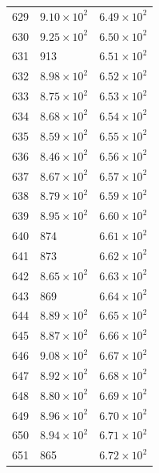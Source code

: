 \begin{table}[H]
\begin{tabular}{lll}
629 & $\displaystyle 9.10 \times 10^{2}$ & $\displaystyle 6.49 \times 10^{2}$ \\
630 & $\displaystyle 9.25 \times 10^{2}$ & $\displaystyle 6.50 \times 10^{2}$ \\
631 & 913 & $\displaystyle 6.51 \times 10^{2}$ \\
632 & $\displaystyle 8.98 \times 10^{2}$ & $\displaystyle 6.52 \times 10^{2}$ \\
633 & $\displaystyle 8.75 \times 10^{2}$ & $\displaystyle 6.53 \times 10^{2}$ \\
634 & $\displaystyle 8.68 \times 10^{2}$ & $\displaystyle 6.54 \times 10^{2}$ \\
635 & $\displaystyle 8.59 \times 10^{2}$ & $\displaystyle 6.55 \times 10^{2}$ \\
636 & $\displaystyle 8.46 \times 10^{2}$ & $\displaystyle 6.56 \times 10^{2}$ \\
637 & $\displaystyle 8.67 \times 10^{2}$ & $\displaystyle 6.57 \times 10^{2}$ \\
638 & $\displaystyle 8.79 \times 10^{2}$ & $\displaystyle 6.59 \times 10^{2}$ \\
639 & $\displaystyle 8.95 \times 10^{2}$ & $\displaystyle 6.60 \times 10^{2}$ \\
640 & 874 & $\displaystyle 6.61 \times 10^{2}$ \\
641 & 873 & $\displaystyle 6.62 \times 10^{2}$ \\
642 & $\displaystyle 8.65 \times 10^{2}$ & $\displaystyle 6.63 \times 10^{2}$ \\
643 & 869 & $\displaystyle 6.64 \times 10^{2}$ \\
644 & $\displaystyle 8.89 \times 10^{2}$ & $\displaystyle 6.65 \times 10^{2}$ \\
645 & $\displaystyle 8.87 \times 10^{2}$ & $\displaystyle 6.66 \times 10^{2}$ \\
646 & $\displaystyle 9.08 \times 10^{2}$ & $\displaystyle 6.67 \times 10^{2}$ \\
647 & $\displaystyle 8.92 \times 10^{2}$ & $\displaystyle 6.68 \times 10^{2}$ \\
648 & $\displaystyle 8.80 \times 10^{2}$ & $\displaystyle 6.69 \times 10^{2}$ \\
649 & $\displaystyle 8.96 \times 10^{2}$ & $\displaystyle 6.70 \times 10^{2}$ \\
650 & $\displaystyle 8.94 \times 10^{2}$ & $\displaystyle 6.71 \times 10^{2}$ \\
651 & 865 & $\displaystyle 6.72 \times 10^{2}$ \\

\end{tabular}
\end{table}
